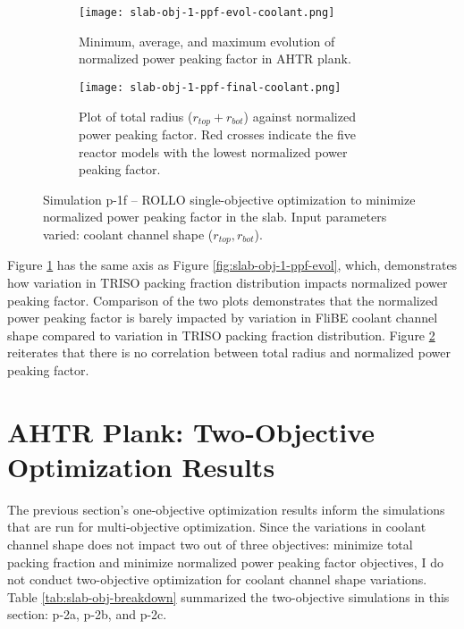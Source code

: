 \begin{figure}[htbp!]
    \centering
    \begin{subfigure}{\textwidth}
        \texttt{[image: slab-obj-1-ppf-evol-coolant.png]}
        \caption{Minimum, average, and maximum evolution of normalized power 
        peaking factor in AHTR plank.}
        \label{fig:slab-obj-1-ppf-evol-coolant} 
    \end{subfigure}
    \begin{subfigure}{\textwidth}
        \texttt{[image: slab-obj-1-ppf-final-coolant.png]}
        \caption{Plot of total radius ($r_{top} + r_{bot}$) against normalized 
        power peaking factor. Red crosses indicate the five reactor models with the 
        lowest normalized power peaking factor.}
        \label{fig:slab-obj-1-ppf-final-coolant} 
    \end{subfigure}
    \caption{Simulation p-1f -- ROLLO single-objective optimization to minimize normalized power 
    peaking factor in the slab. Input parameters varied: coolant channel shape 
    ($r_{top}, r_{bot}$).}
    \label{fig:slab-obj-1-ppf-coolant}
\end{figure}
Figure \ref{fig:slab-obj-1-ppf-evol-coolant} has the same axis as Figure 
\ref{fig:slab-obj-1-ppf-evol}, which, demonstrates how variation in TRISO packing fraction 
distribution impacts normalized power peaking factor. 
Comparison of the two plots demonstrates that the normalized power
peaking factor is barely impacted by variation in FliBE coolant channel shape compared 
to variation in TRISO packing fraction distribution.
Figure \ref{fig:slab-obj-1-ppf-final-coolant} reiterates that there is no correlation 
between total radius and normalized power peaking factor. 

\pagebreak
\section{AHTR Plank: Two-Objective Optimization Results}
The previous section's one-objective optimization results inform the simulations that 
are run for multi-objective optimization. 
Since the variations in coolant channel shape does not impact two out of three objectives: 
minimize total packing fraction and minimize normalized power peaking factor 
objectives, I do not conduct two-objective optimization for coolant channel shape 
variations.  
Table \ref{tab:slab-obj-breakdown} summarized the two-objective simulations in this 
section: p-2a, p-2b, and p-2c.

